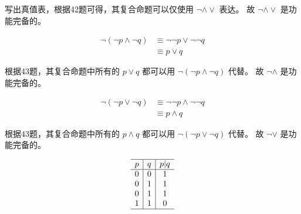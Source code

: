 {{        %
        \begin{practices}
            写出真值表，根据42题可得，其复合命题可以仅使用 $\neg \wedge \vee$ 表达。
            故 $\neg \wedge \vee$ 是功能完备的。
        \end{practices}

        \begin{practices}
            \begin{align*}
                \neg (\neg p \wedge \neg q)
                &\equiv \neg \neg p \vee \neg \neg q \\
                &\equiv p \vee q
            \end{align*}

            根据43题，其复合命题中所有的 $p \vee q$ 都可以用 $\neg (\neg p \wedge \neg q)$ 代替。
            故 $\neg \wedge$ 是功能完备的。
        \end{practices}

        \begin{practices}
            \begin{align*}
                \neg (\neg p \vee \neg q)
                &\equiv \neg \neg p \wedge \neg \neg q \\
                &\equiv p \wedge q
            \end{align*}

            根据43题，其复合命题中所有的 $p \wedge q$ 都可以用 $\neg (\neg p \vee \neg q)$ 代替。
            故 $\neg \vee$ 是功能完备的。
        \end{practices}

        \begin{practices}
            \begin{table}[H]
                \[
                    \begin{array}{c|c|c}
                        \hline
                        p & q & p | q \\
                        \hline
                        0 & 0 & 1 \\
                        0 & 1 & 1 \\
                        0 & 1 & 1 \\
                        1 & 1 & 0 \\
                        \hline
                   \end{array}
               \]
            \end{table}
        \end{practices}

}}
